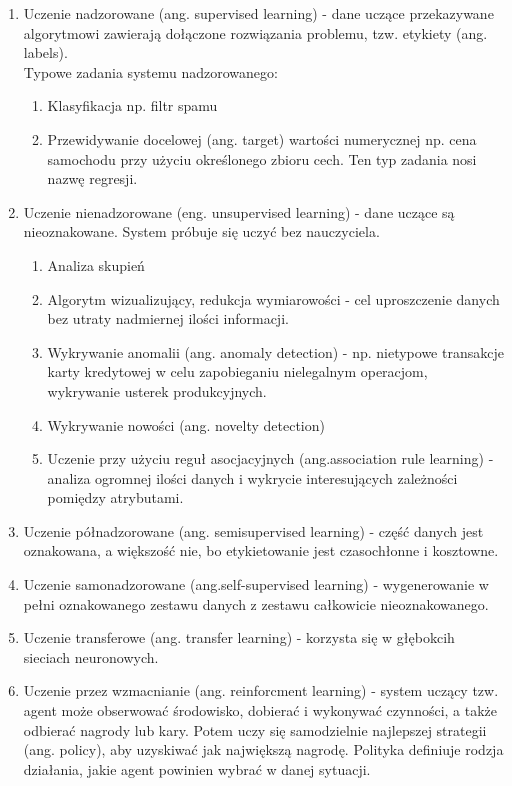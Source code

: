 \documentclass[polish,12pt,a4paper]{article}
\begin{document}
\begin{enumerate}
\begin{enumerate}
			\item Uczenie nadzorowane (ang. supervised learning) - dane uczące przekazywane algorytmowi zawierają dołączone rozwiązania problemu, tzw. etykiety (ang. labels). \\
			Typowe zadania systemu nadzorowanego:
			\begin{enumerate}
				\item Klasyfikacja np. filtr spamu
				\item Przewidywanie docelowej (ang. target) wartości numerycznej np. cena samochodu przy użyciu określonego zbioru cech. Ten typ zadania nosi nazwę regresji.
			\end{enumerate}
			\item Uczenie nienadzorowane (eng. unsupervised learning) - dane uczące są nieoznakowane. System próbuje się uczyć bez nauczyciela.
			\begin{enumerate}
				\item Analiza skupień
				\item Algorytm wizualizujący, redukcja wymiarowości - cel uproszczenie danych bez utraty nadmiernej ilości informacji.
				\item Wykrywanie anomalii (ang. anomaly detection) - np. nietypowe transakcje karty kredytowej w celu zapobieganiu nielegalnym operacjom, wykrywanie usterek produkcyjnych.
				\item Wykrywanie nowości (ang. novelty detection)
				\item Uczenie przy użyciu reguł asocjacyjnych (ang.association rule learning) - analiza ogromnej ilości danych i wykrycie interesujących zależności pomiędzy atrybutami.
			\end{enumerate}
			\item Uczenie półnadzorowane (ang. semisupervised learning) - część danych jest oznakowana, a większość nie, bo etykietowanie jest czasochłonne i kosztowne. 
			\item Uczenie samonadzorowane (ang.self-supervised learning) - wygenerowanie w pełni oznakowanego zestawu danych z zestawu całkowicie nieoznakowanego.
			\item Uczenie transferowe (ang. transfer learning) - korzysta się w głębokcih sieciach neuronowych.
			\item Uczenie przez wzmacnianie (ang. reinforcment learning) - system uczący tzw. agent może obserwować środowisko, dobierać i wykonywać czynności, a także odbierać nagrody lub kary. Potem uczy się samodzielnie najlepszej strategii (ang. policy), aby uzyskiwać jak największą nagrodę. Polityka definiuje rodzja działania, jakie agent powinien wybrać w danej sytuacji.

\end{enumerate}
\end{enumerate}
\end{document}
